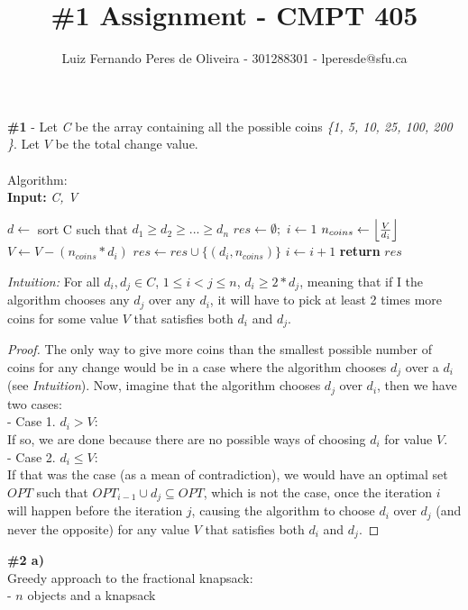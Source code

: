 \documentclass{article}
\title{\#1 Assignment - CMPT 405}
\author{Luiz Fernando Peres de Oliveira - 301288301 - lperesde@sfu.ca}
\newcommand\tab[1][1cm]{\hspace*{#1}}
\DeclarePairedDelimiter\floor{\lfloor}{\rfloor}
\begin{document}
\maketitle

\textbf{\#1} - Let \textit{C} be the array containing all the possible coins \textit{\{1, 5, 10, 25, 100, 200 \}}. Let $V$ be the total change value.\\
\\
Algorithm:\\
\textbf{Input:} \textit{C, V}
\begin{algorithmic}
\State $d\gets$ sort C such that $d_1 \geq d_2 \geq ... \geq d_n$
\State $res \gets \emptyset;$  $i \gets 1$
    \State $n_{coins}\gets   \floor*{\frac{V}{d_i}}$
    \State $V \gets V - (n_{coins} * d_i)$
    \State $res \gets res \cup \{ (d_i, n_{coins}) \}$
\EndIf
\State $i \gets i + 1$
\EndWhile
\State \textbf{return} $res$\\
\end{algorithmic}
\textit{Intuition:} For all $d_i, d_j \in C$, $1 \leq i < j \leq n$, $d_i \geq 2*d_j$, meaning that if I the algorithm chooses any $d_j$ over any $d_i$, it will have to pick at least 2 times more coins for some value $V$ that satisfies both $d_i$ and $d_j$.\\
\begin{proof}
The only way to give more coins than the smallest possible number of coins for any change would be in a case where the algorithm chooses $d_j$ over a $d_i$ (see \textit{Intuition}). Now, imagine that the algorithm chooses $d_j$ over $d_i$, then we have two cases:\\
- Case 1. $d_i > V$:\\
\tab If so, we are done because there are no possible ways of choosing $d_i$ for value $V$.\\
- Case 2. $d_i \leq V$:\\
\tab If that was the case (as a mean of contradiction), we would have an optimal set $OPT$ such that $OPT_{i-1} \cup d_j \subseteq OPT$, which is not the case, once the iteration $i$ will happen before the iteration $j$, causing the algorithm to choose $d_i$ over $d_j$ (and never the opposite) for any value $V$ that satisfies both $d_i$ and $d_j$.\qedhere
\end{proof}
\textbf{\#2 a)}\\
Greedy approach to the fractional knapsack:\\
- $n$ objects and a knapsack\\
\end{document}
